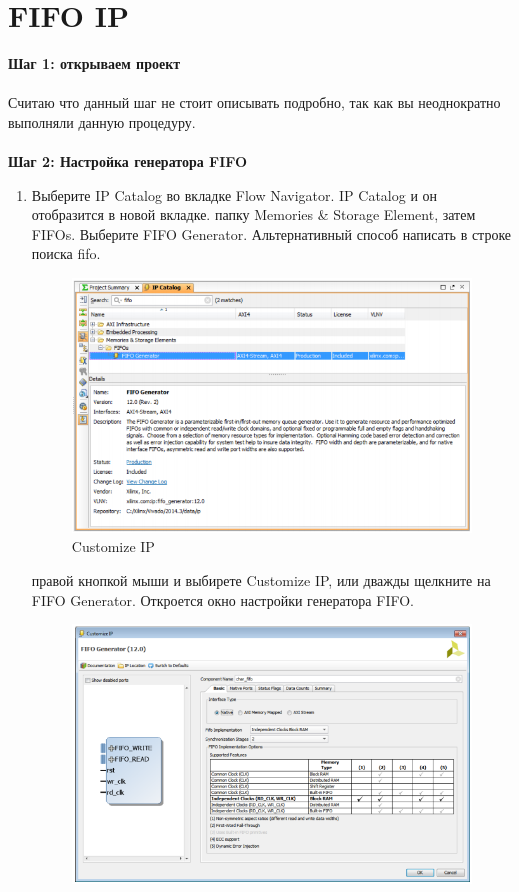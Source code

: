 \section{FIFO IP}

 \noindent 
\textbf{Шаг 1: открываем проект} \\ 
\\
Считаю что данный шаг не стоит описывать подробно, так как вы неоднократно выполняли данную процедуру.\\
\\
\textbf{Шаг 2: Настройка генератора FIFO}
\begin{enumerate} 
\item Выберите IP Catalog во вкладке  Flow Navigator. 
 IP Catalog и он отобразится в новой вкладке.
 папку Memories \& Storage Element, затем FIFOs. Выберите FIFO Generator. Альтернативный способ написать в строке поиска fifo.
\begin{figure}[h]
\centering
\includegraphics[width=1.1\textwidth]{fifo_ip_1}
\caption{ Customize IP}
\label{fifo_ip_1_label}
\end{figure}
 правой кнопкой мыши и выбирете Customize IP, или дважды щелкните на FIFO Generator. Откроется окно настройки генератора FIFO.
\begin{figure}[h]
\centering
\includegraphics[width=1.1\textwidth]{fifo_ip_2}

\end{figure}
\end{enumerate}
